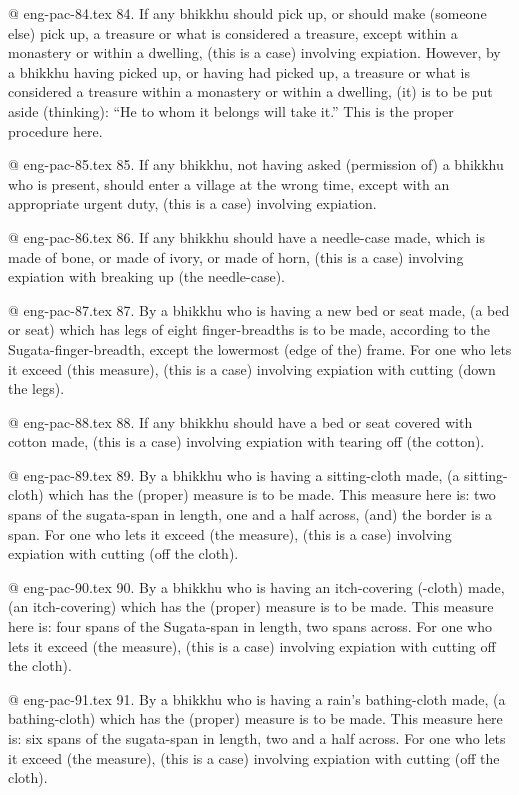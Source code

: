 @ eng-pac-84.tex
84. If any bhikkhu should pick up, or should make (someone else) pick up, a treasure or what is considered a treasure, except within a monastery or within a dwelling, (this is a case) involving expiation. However, by a bhikkhu having picked up, or having had picked up, a treasure or what is considered a treasure within a monastery or within a dwelling, (it) is to be put aside (thinking): “He to whom it belongs will take it.” This is the proper procedure here.

@ eng-pac-85.tex
85. If any bhikkhu, not having asked (permission of) a bhikkhu who is present, should enter a village at the wrong time, except with an appropriate urgent duty, (this is a case) involving expiation.

@ eng-pac-86.tex
86. If any bhikkhu should have a needle-case made, which is made of bone, or made of ivory, or made of horn, (this is a case) involving expiation with breaking up (the needle-case).

@ eng-pac-87.tex
87. By a bhikkhu who is having a new bed or seat made, (a bed or seat) which has legs of eight finger-breadths is to be made, according to the Sugata-finger-breadth, except the lowermost (edge of the) frame. For one who lets it exceed (this measure), (this is a case) involving expiation with cutting (down the legs).

@ eng-pac-88.tex
88. If any bhikkhu should have a bed or seat covered with cotton made, (this is a case) involving expiation with tearing off (the cotton).

@ eng-pac-89.tex
89. By a bhikkhu who is having a sitting-cloth made, (a sitting-cloth) which has the (proper) measure is to be made. This measure here is: two spans of the sugata-span in length, one and a half across, (and) the border is a span. For one who lets it exceed (the measure), (this is a case) involving expiation with cutting (off the cloth).

@ eng-pac-90.tex
90. By a bhikkhu who is having an itch-covering (-cloth) made, (an itch-covering) which has the (proper) measure is to be made. This measure here is: four spans of the Sugata-span in length, two spans across. For one who lets it exceed (the measure), (this is a case) involving expiation with cutting off the cloth).

@ eng-pac-91.tex
91. By a bhikkhu who is having a rain's bathing-cloth made, (a bathing-cloth) which has the (proper) measure is to be made. This measure here is: six spans of the sugata-span in length, two and a half across. For one who lets it exceed (the measure), (this is a case) involving expiation with cutting (off the cloth).

